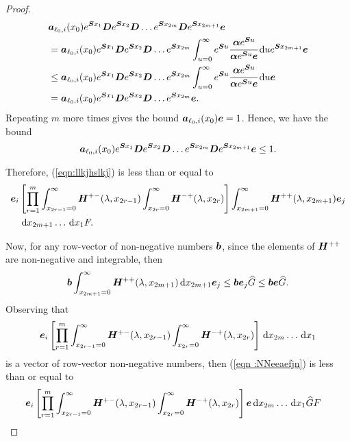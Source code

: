 \begin{proof}
	\begin{align*}
		&\boldsymbol a_{\ell_0,i}(x_0)e^{\boldsymbol{S}x_1} \boldsymbol{D}e^{\boldsymbol{S}x_2} \boldsymbol{D}\dots e^{\boldsymbol{S}x_{2m}} \boldsymbol{D}e^{\boldsymbol{S}x_{2m+1}}{\boldsymbol e}
		\\& = \boldsymbol a_{\ell_0,i}(x_0)e^{\boldsymbol{S}x_1} \boldsymbol{D}e^{\boldsymbol{S}x_2} \boldsymbol{D}\dots e^{\boldsymbol{S}x_{2m}} \int_{u=0}^\infty e^{\boldsymbol Su}\cfrac{\boldsymbol \alpha e^{\boldsymbol Su}}{\boldsymbol \alpha e^{\boldsymbol Su}\boldsymbol e}\, \mathrm{d} u e^{\boldsymbol{S}x_{2m+1}}{\boldsymbol e}
		\\&\leq \boldsymbol a_{\ell_0,i}(x_0)e^{\boldsymbol{S}x_1} \boldsymbol{D}e^{\boldsymbol{S}x_2} \boldsymbol{D}\dots e^{\boldsymbol{S}x_{2m}} \int_{u=0}^\infty e^{\boldsymbol Su}\cfrac{\boldsymbol \alpha e^{\boldsymbol Su}}{\boldsymbol \alpha e^{\boldsymbol Su}\boldsymbol e}\, \mathrm{d} u {\boldsymbol e}
		\\&=\boldsymbol a_{\ell_0,i}(x_0)e^{\boldsymbol{S}x_1} \boldsymbol{D}e^{\boldsymbol{S}x_2} \boldsymbol{D}\dots e^{\boldsymbol{S}x_{2m}} \boldsymbol e.
	\end{align*}
	Repeating \(m\) more times gives the bound \(\boldsymbol a_{\ell_0,i}(x_0)\boldsymbol e=1\). Hence, we have the bound 
	\[\boldsymbol a_{\ell_0,i}(x_0)e^{\boldsymbol{S}x_1} \boldsymbol{D}e^{\boldsymbol{S}x_2} \boldsymbol{D}\dots e^{\boldsymbol{S}x_{2m}} \boldsymbol{D}e^{\boldsymbol{S}x_{2m+1}}{\boldsymbol e}\leq 1.\]

    Therefore, (\ref{eqn:llkjhslkj}) is less than or equal to 
	\begin{align}
		& \boldsymbol e_i \left[\prod_{r=1}^m\int_{x_{2r-1}=0}^\infty \boldsymbol H^{+-}(\lambda,x_{2r-1})\nonumber
		\int_{x_{2r}=0}^\infty \boldsymbol H^{-+}(\lambda,x_{2r}) \right]
		\int_{x_{2m+1}=0}^\infty \boldsymbol H^{++}(\lambda,x_{2m+1}) \boldsymbol e_j
		\\&\quad \, \mathrm{d} x_{2m+1} \dots \, \mathrm{d} x_1 F. \label{eqn :NNeeaefjn}
	\end{align}

	Now, for any row-vector of non-negative numbers \(\boldsymbol b\), since the elements of \(\boldsymbol H^{++}\) are non-negative and integrable, then 
	\[\boldsymbol b \int_{x_{2m+1}=0}^\infty \boldsymbol H^{++}(\lambda, x_{2m+1})\, \mathrm{d} x_{2m+1} \boldsymbol e_j \leq \boldsymbol b \boldsymbol e_j \widehat G\leq \boldsymbol b \boldsymbol e \widehat G.\]
	Observing that  
	\[\boldsymbol e_i \left[\prod_{r=1}^m\int_{x_{2r-1}=0}^\infty \boldsymbol H^{+-}(\lambda,x_{2r-1})\nonumber
	\int_{x_{2r}=0}^\infty \boldsymbol H^{-+}(\lambda,x_{2r}) \right]
	\, \mathrm{d} x_{2m}\dots \, \mathrm{d} x_1\] 
	is a vector of row-vector non-negative numbers, then (\ref{eqn :NNeeaefjn}) is less than or equal to 
	\begin{align}
		&\boldsymbol e_i \left[\prod_{r=1}^m\int_{x_{2r-1}=0}^\infty \boldsymbol H^{+-}(\lambda,x_{2r-1})
		\int_{x_{2r}=0}^\infty \boldsymbol H^{-+}(\lambda,x_{2r}) \right]
		\boldsymbol e\, \mathrm{d} x_{2m}\dots \, \mathrm{d} x_1\widehat G F\label{eqn :NNeeaefjn12}
	\end{align}


\end{proof}
